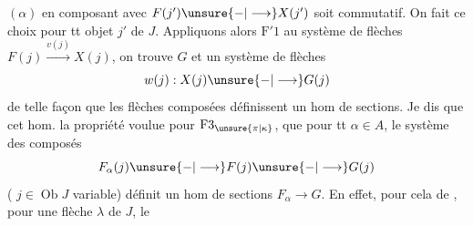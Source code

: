 $(\alpha)$ en composant avec $F(j')\unsure{\mathbin{-}|\longrightarrow}X(j')$ soit commutatif. On  fait ce choix pour tt objet $j'$ de $J$. Appliquons alors $\mathrm F'1$  au système de flèches
$F(j)\xrightarrow{v(j)}X(j)$, on trouve $G$ et un système de flèches 
\[
 w(j):X(j)\unsure{\mathbin{-}|\longrightarrow}G(j)
\]
de telle façon que  les flèches composées
définissent un hom de sections\unsure{,|{}}. Je dis que cet hom.  la propriété voulue pour $\mathrm F3_{\unsure{\pi|\kappa}}$,  que pour tt $\alpha\in A$, le système des composés
\[
 F_{\alpha}(j)\unsure{\mathbin{-}|\longrightarrow} F(j)\unsure{\mathbin{-}|\longrightarrow}G(j)
\]
( $j\in\operatorname{Ob}J$ variable) définit un hom de sections $F_{\alpha}\longrightarrow G$. En effet,   pour cela de , pour une flèche $\lambda$ de $J$, le
